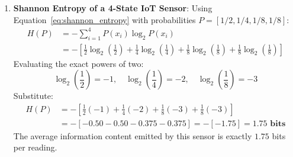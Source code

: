 \begin{enumerate}
\begin{enumerate}[label=(\alph*)]
        \item \textbf{Second Moment Multiplier}:
        \begin{equation*}
        \beta_2^3 = (0.999)^3 \approx 0.997003
        \end{equation*}
        \begin{equation*}
        \frac{1}{1 - \beta_2^3} = \frac{1}{1 - 0.997003} = \frac{1}{0.002997} \approx \mathbf{333.667}
        \end{equation*}
        The raw second moment $v_3$ is scaled up by $\approx 333.7\times$ to compensate for the extreme zero bias.
    \end{enumerate}

    \item \textbf{Shannon Entropy of a 4-State IoT Sensor}:
    Using Equation~\eqref{eq:shannon_entropy} with probabilities $P = [1/2, 1/4, 1/8, 1/8]$:
    \begin{align*}
    H(P) &= -\sum_{i=1}^{4} P(x_i) \log_2 P(x_i) \\
    &= -\left[ \frac{1}{2} \log_2\left(\frac{1}{2}\right) + \frac{1}{4} \log_2\left(\frac{1}{4}\right) + \frac{1}{8} \log_2\left(\frac{1}{8}\right) + \frac{1}{8} \log_2\left(\frac{1}{8}\right) \right]
    \end{align*}
    Evaluating the exact powers of two:
    \begin{equation*}
    \log_2\left(\frac{1}{2}\right) = -1, \quad \log_2\left(\frac{1}{4}\right) = -2, \quad \log_2\left(\frac{1}{8}\right) = -3
    \end{equation*}
    Substitute:
    \begin{align*}
    H(P) &= -\left[ \frac{1}{2}(-1) + \frac{1}{4}(-2) + \frac{1}{8}(-3) + \frac{1}{8}(-3) \right] \\
    &= -\left[ -0.50 - 0.50 - 0.375 - 0.375 \right] = -[-1.75] = \mathbf{1.75\text{ bits}}
    \end{align*}
    The average information content emitted by this sensor is exactly $1.75$ bits per reading.


\end{enumerate}
